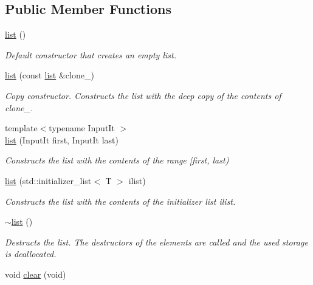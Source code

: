 \subsection*{Public Member Functions}
\begin{DoxyCompactItemize}
\item 
\hyperlink{classls_1_1list_a3717713cf5e4558e543b533d14eef424}{list} ()\hypertarget{classls_1_1list_a3717713cf5e4558e543b533d14eef424}{}\label{classls_1_1list_a3717713cf5e4558e543b533d14eef424}

\begin{DoxyCompactList}\small\item\em Default constructor that creates an empty list. \end{DoxyCompactList}\item 
\hyperlink{classls_1_1list_a20900981ea1cc1a4851f0078a2fd1bfd}{list} (const \hyperlink{classls_1_1list}{list} \&clone\+\_\+)
\begin{DoxyCompactList}\small\item\em Copy constructor. Constructs the list with the deep copy of the contents of clone\+\_\+. \end{DoxyCompactList}\item 
{\footnotesize template$<$typename Input\+It $>$ }\\\hyperlink{classls_1_1list_a783b17259b4ac0805c58d6a959d3c11f}{list} (Input\+It first, Input\+It last)
\begin{DoxyCompactList}\small\item\em Constructs the list with the contents of the range \mbox{[}first, last) \end{DoxyCompactList}\item 
\hyperlink{classls_1_1list_ac4d5e3102e51f80bcc82fdab0b8d187f}{list} (std\+::initializer\+\_\+list$<$ T $>$ ilist)
\begin{DoxyCompactList}\small\item\em Constructs the list with the contents of the initializer list ilist. \end{DoxyCompactList}\item 
\hyperlink{classls_1_1list_ab341963c62740c4e4d1a042fdba9c856}{$\sim$list} ()\hypertarget{classls_1_1list_ab341963c62740c4e4d1a042fdba9c856}{}\label{classls_1_1list_ab341963c62740c4e4d1a042fdba9c856}

\begin{DoxyCompactList}\small\item\em Destructs the list. The destructors of the elements are called and the used storage is deallocated. \end{DoxyCompactList}\item 
void \hyperlink{classls_1_1list_a28315f48ca173954648dd8b8ccf04124}{clear} (void)\hypertarget{classls_1_1list_a28315f48ca173954648dd8b8ccf04124}{}\label{classls_1_1list_a28315f48ca173954648dd8b8ccf04124}


\end{DoxyCompactItemize}
